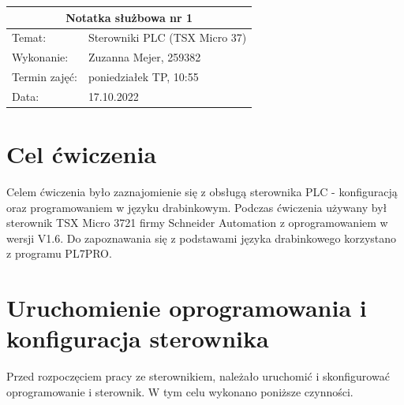\documentclass[12pt]{article}
\begin{document}
\begin{table}[H]
    \centering
    \renewcommand{\arraystretch}{1.5}
    \begin{tabularx}{\textwidth}{|X|X|}
    \hline
    \multicolumn{2}{|c|}{\large\textbf{Notatka służbowa nr 1}} \\ \hline
    Temat:          & Sterowniki PLC (TSX Micro 37)     \\ \hline
    Wykonanie:      & Zuzanna Mejer, 259382   \\ \hline
    Termin zajęć:   & poniedziałek TP, 10:55  \\ \hline  
    Data:           & 17.10.2022    \\ \hline
    \end{tabularx}
    \end{table}

\section{Cel ćwiczenia}
Celem ćwiczenia było zaznajomienie się z obsługą sterownika PLC - konfiguracją oraz programowaniem w języku drabinkowym. Podczas ćwiczenia używany był sterownik TSX Micro 3721 firmy Schneider Automation z oprogramowaniem w wersji V1.6. Do zapoznawania się z podstawami języka drabinkowego korzystano z programu PL7PRO. 

\section{Uruchomienie oprogramowania i konfiguracja sterownika}
Przed rozpoczęciem pracy ze sterownikiem, należało uruchomić i skonfigurować oprogramowanie i sterownik. W tym celu wykonano poniższe czynności.
\end{document}
